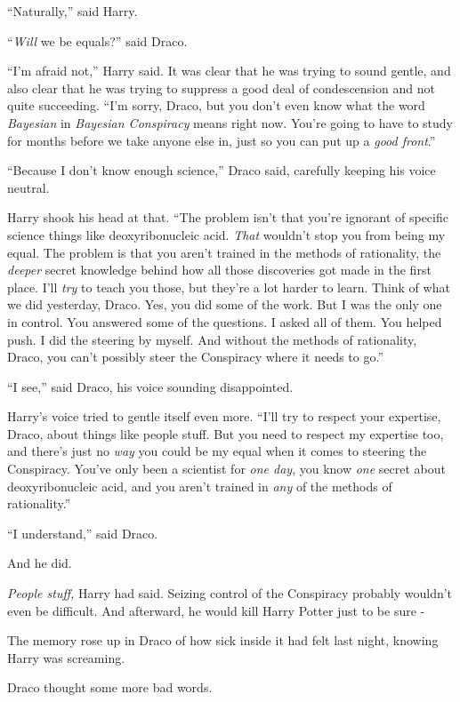 ``Naturally,'' said Harry.

``\emph{Will} we be equals?'' said Draco.

``I'm afraid not,'' Harry said. It was clear that he was trying to sound gentle, and also clear that he was trying to suppress a good deal of condescension and not quite succeeding. ``I'm sorry, Draco, but you don't even know what the word \emph{Bayesian} in \emph{Bayesian Conspiracy} means right now. You're going to have to study for months before we take anyone else in, just so you can put up a \emph{good front}.''

``Because I don't know enough science,'' Draco said, carefully keeping his voice neutral.

Harry shook his head at that. ``The problem isn't that you're ignorant of specific science things like deoxyribonucleic acid. \emph{That} wouldn't stop you from being my equal. The problem is that you aren't trained in the methods of rationality, the \emph{deeper} secret knowledge behind how all those discoveries got made in the first place. I'll \emph{try} to teach you those, but they're a lot harder to learn. Think of what we did yesterday, Draco. Yes, you did some of the work. But I was the only one in control. You answered some of the questions. I asked all of them. You helped push. I did the steering by myself. And without the methods of rationality, Draco, you can't possibly steer the Conspiracy where it needs to go.''

``I see,'' said Draco, his voice sounding disappointed.

Harry's voice tried to gentle itself even more. ``I'll try to respect your expertise, Draco, about things like people stuff. But you need to respect my expertise too, and there's just no \emph{way} you could be my equal when it comes to steering the Conspiracy. You've only been a scientist for \emph{one day}, you know \emph{one} secret about deoxyribonucleic acid, and you aren't trained in \emph{any} of the methods of rationality.''

``I understand,'' said Draco.

And he did.

\emph{People stuff,} Harry had said. Seizing control of the Conspiracy probably wouldn't even be difficult. And afterward, he would kill Harry Potter just to be sure -

The memory rose up in Draco of how sick inside it had felt last night, knowing Harry was screaming.

Draco thought some more bad words.

